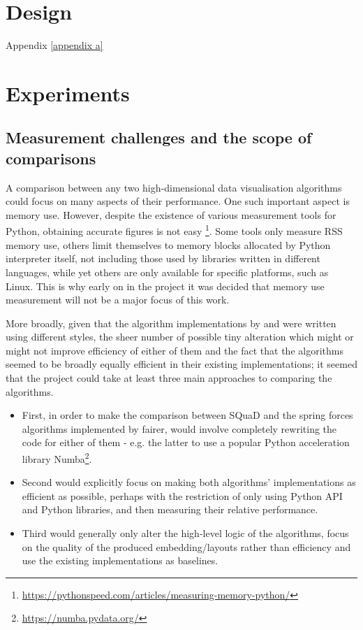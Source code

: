 \documentclass{l4proj}
\begin{document}
\chapter{Design}



Appendix \ref{appendix a}

\chapter{Experiments}

\section{Measurement challenges and the scope of comparisons}
\label{sec:measurements and scope}

A comparison between any two high-dimensional data visualisation algorithms could focus on many aspects of their performance. One such important aspect is memory use. However, despite the existence of various measurement tools for Python, obtaining accurate figures is not easy \footnote{ \url{https://pythonspeed.com/articles/measuring-memory-python/}}. Some tools only measure RSS memory use, others limit themselves to memory blocks allocated by Python interpreter itself, not including those used by libraries written in different languages, while yet others are only available for specific platforms, such as Linux. This is why early on in the project it was decided that memory use measurement will not be a major focus of this work.

More broadly, given that the algorithm implementations by \citet{2019} and \citet{squad} were written using different styles, the sheer number of possible tiny alteration which might or might not improve efficiency of either of them and the fact that the algorithms seemed to be broadly equally efficient in their existing implementations; it seemed that the project could take at least three main approaches to comparing the algorithms.

\begin{itemize}
\item  First, in order to make the comparison between SQuaD and the spring forces algorithms implemented by \citet{2019} fairer, would involve completely rewriting the code  for either of them - e.g. the latter to use a popular Python acceleration library Numba\footnote{ \url{https://numba.pydata.org/}}.

\item  Second would explicitly focus on making both algorithms' implementations as efficient as possible, perhaps with the restriction of only using Python API and Python libraries, and then measuring their relative performance.

\item  Third would generally only alter the high-level logic of the algorithms, focus on the quality of the produced embedding/layouts rather than efficiency and use the existing implementations as baselines.
\end{itemize}
\end{document}
